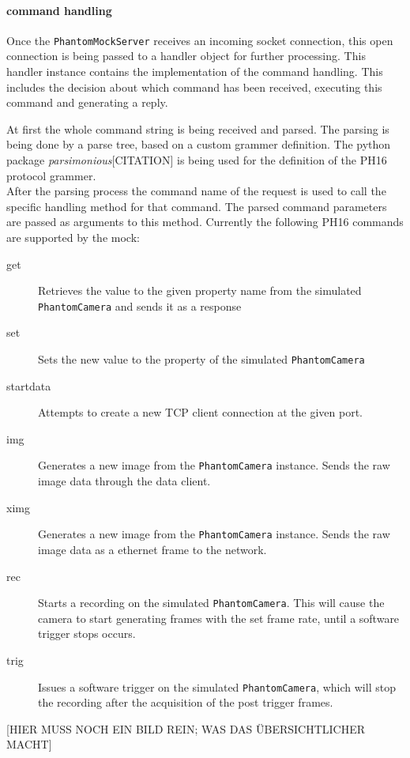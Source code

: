 \paragraph{command handling}
Once the \texttt{PhantomMockServer} receives an incoming socket connection, this open connection is being passed to a handler object for further processing. This handler instance contains the implementation of the command handling. This includes the decision about which command has been received, executing this command and generating a reply.\par 
At first the whole command string is being received and parsed. The parsing is being done by a parse tree, based on a custom grammer definition. The python package \textit{parsimonious}[CITATION] is being used for the definition of the PH16 protocol grammer.\\
After the parsing process the command name of the request is used to call the specific handling method for that command. The parsed command parameters are passed as arguments to this method. Currently the following PH16 commands are supported by the mock:
\begin{description}
\item[get] Retrieves the value to the given property name from the simulated \texttt{PhantomCamera} and sends it as a response
\item[set] Sets the new value to the property of the simulated \texttt{PhantomCamera}
\item[startdata] Attempts to create a new TCP client connection at the given port.
\item[img] Generates a new image from the \texttt{PhantomCamera} instance. Sends the raw image data through the data client.
\item[ximg] Generates a new image from the \texttt{PhantomCamera} instance. Sends the raw image data as a ethernet frame to the network.
\item[rec] Starts a recording on the simulated \texttt{PhantomCamera}. This will cause the camera to start generating frames with the set frame rate, until a software trigger stops occurs. 
\item[trig] Issues a software trigger on the simulated \texttt{PhantomCamera}, which will 
stop the recording after the acquisition of the post trigger frames.
\end{description}
[HIER MUSS NOCH EIN BILD REIN; WAS DAS ÜBERSICHTLICHER MACHT]

